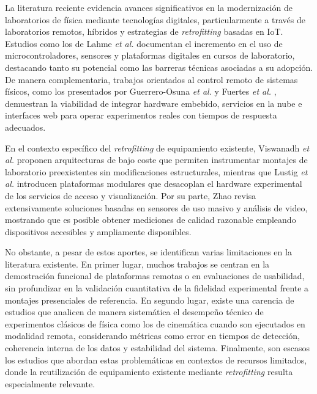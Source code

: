 \documentclass[journal,article,submit,pdftex]{Definitions/mdpi}
\begin{document}
La literatura reciente evidencia avances significativos en la modernización de laboratorios de física mediante tecnologías digitales, particularmente a través de laboratorios remotos, híbridos y estrategias de \textit{retrofitting} basadas en IoT. Estudios como los de Lahme \textit{et al.} \cite{r1} documentan el incremento en el uso de microcontroladores, sensores y plataformas digitales en cursos de laboratorio, destacando tanto su potencial como las barreras técnicas asociadas a su adopción. De manera complementaria, trabajos orientados al control remoto de sistemas físicos, como los presentados por Guerrero-Osuna \textit{et al.} \cite{r4} y Fuertes \textit{et al.} \cite{r3}, demuestran la viabilidad de integrar hardware embebido, servicios en la nube e interfaces web para operar experimentos reales con tiempos de respuesta adecuados.

En el contexto específico del \textit{retrofitting} de equipamiento existente, Viswanadh \textit{et al.} \cite{r2} proponen arquitecturas de bajo coste que permiten instrumentar montajes de laboratorio preexistentes sin modificaciones estructurales, mientras que Lustig \textit{et al.} \cite{r5} introducen plataformas modulares que desacoplan el hardware experimental de los servicios de acceso y visualización. Por su parte, Zhao \cite{r6} revisa extensivamente soluciones basadas en sensores de uso masivo y análisis de video, mostrando que es posible obtener mediciones de calidad razonable empleando dispositivos accesibles y ampliamente disponibles.

No obstante, a pesar de estos aportes, se identifican varias limitaciones en la literatura existente. En primer lugar, muchos trabajos se centran en la demostración funcional de plataformas remotas o en evaluaciones de usabilidad, sin profundizar en la validación cuantitativa de la fidelidad experimental frente a montajes presenciales de referencia. En segundo lugar, existe una carencia de estudios que analicen de manera sistemática el desempeño técnico de experimentos clásicos de física como los de cinemática cuando son ejecutados en modalidad remota, considerando métricas como error en tiempos de detección, coherencia interna de los datos y estabilidad del sistema. Finalmente, son escasos los estudios que abordan estas problemáticas en contextos de recursos limitados, donde la reutilización de equipamiento existente mediante \textit{retrofitting} resulta especialmente relevante.
\end{document}
